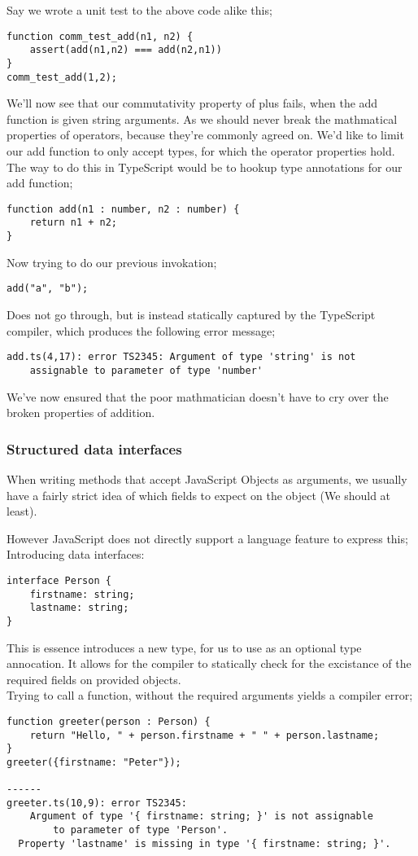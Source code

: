 Say we wrote a unit test to the above code alike this;
\begin{verbatim}
function comm_test_add(n1, n2) {
    assert(add(n1,n2) === add(n2,n1))
}
comm_test_add(1,2);
\end{verbatim}
We'll now see that our commutativity property of plus fails, when the add function is given string arguments.
As we should never break the mathmatical properties of operators, because they're commonly agreed on.
We'd like to limit our add function to only accept types, for which the operator properties hold.
The way to do this in TypeScript would be to hookup type annotations for our add function;
\begin{verbatim}
function add(n1 : number, n2 : number) {
    return n1 + n2;
}
\end{verbatim}
Now trying to do our previous invokation;
\begin{verbatim}
add("a", "b");
\end{verbatim}
Does not go through, but is instead statically captured by the TypeScript compiler, which produces the following error message;
\begin{verbatim}
add.ts(4,17): error TS2345: Argument of type 'string' is not
    assignable to parameter of type 'number'
\end{verbatim}
We've now ensured that the poor mathmatician doesn't have to cry over the broken properties of addition.

\subsubsection*{Structured data interfaces}
When writing methods that accept JavaScript Objects as arguments,
we usually have a fairly strict idea of which fields to expect on the object
(We should at least).

However JavaScript does not directly support a language feature to express this; Introducing data interfaces:
\begin{verbatim}
interface Person {
    firstname: string;
    lastname: string;
}
\end{verbatim}
This is essence introduces a new type, for us to use as an optional type annocation.
It allows for the compiler to statically check for the excistance of the required fields on provided objects.
\\
Trying to call a function, without the required arguments yields a compiler error;
\begin{verbatim}
function greeter(person : Person) {
    return "Hello, " + person.firstname + " " + person.lastname;
}
greeter({firstname: "Peter"});

------
greeter.ts(10,9): error TS2345:
    Argument of type '{ firstname: string; }' is not assignable
        to parameter of type 'Person'.
  Property 'lastname' is missing in type '{ firstname: string; }'.
\end{verbatim}

